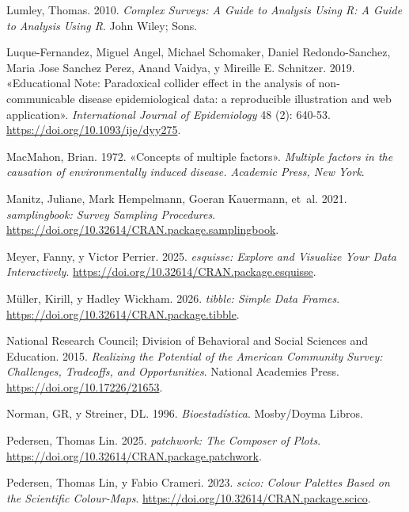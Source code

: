 \documentclass[
  spanish,
  a4paper,
]{scrbook}
\newlength{\cslhangindent}
\newenvironment{CSLReferences}[2] %
 {\begin{list}{}{%
  \setlength{\itemindent}{0pt}
  \setlength{\leftmargin}{0pt}
  \setlength{\parsep}{0pt}
  \ifodd #1
   \setlength{\leftmargin}{\cslhangindent}
   \setlength{\itemindent}{-1\cslhangindent}
  \fi
  \setlength{\itemsep}{#2\baselineskip}}}
 {\end{list}}
\begin{document}
\begin{CSLReferences}{1}{1}
Lumley, Thomas. 2010. \emph{Complex Surveys: A Guide to Analysis Using
R: A Guide to Analysis Using R}. John Wiley; Sons.

Luque-Fernandez, Miguel Angel, Michael Schomaker, Daniel
Redondo-Sanchez, Maria Jose Sanchez Perez, Anand Vaidya, y Mireille E.
Schnitzer. 2019. {«Educational Note: Paradoxical collider effect in the
analysis of non-communicable disease epidemiological data: a
reproducible illustration and web application»}. \emph{International
Journal of Epidemiology} 48 (2): 640-53.
\url{https://doi.org/10.1093/ije/dyy275}.

MacMahon, Brian. 1972. {«Concepts of multiple factors»}. \emph{Multiple
factors in the causation of environmentally induced disease. Academic
Press, New York}.

Manitz, Juliane, Mark Hempelmann, Goeran Kauermann, et~al. 2021.
\emph{samplingbook: Survey Sampling Procedures}.
\url{https://doi.org/10.32614/CRAN.package.samplingbook}.

Meyer, Fanny, y Victor Perrier. 2025. \emph{esquisse: Explore and
Visualize Your Data Interactively}.
\url{https://doi.org/10.32614/CRAN.package.esquisse}.

Müller, Kirill, y Hadley Wickham. 2026. \emph{tibble: Simple Data
Frames}. \url{https://doi.org/10.32614/CRAN.package.tibble}.

National Research Council; Division of Behavioral and Social Sciences
and Education. 2015. \emph{Realizing the {Potential} of the {American}
{Community} {Survey}: {Challenges}, {Tradeoffs}, and {Opportunities}}.
National Academies Press. \url{https://doi.org/10.17226/21653}.

Norman, GR, y Streiner, DL. 1996. \emph{Bioestadística}. Mosby/Doyma
Libros.

Pedersen, Thomas Lin. 2025. \emph{patchwork: The Composer of Plots}.
\url{https://doi.org/10.32614/CRAN.package.patchwork}.

Pedersen, Thomas Lin, y Fabio Crameri. 2023. \emph{scico: Colour
Palettes Based on the Scientific Colour-Maps}.
\url{https://doi.org/10.32614/CRAN.package.scico}.


\end{CSLReferences}
\end{document}
